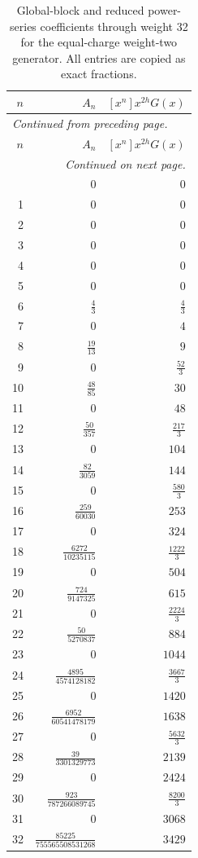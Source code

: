 \begingroup\small
\setlength{\tabcolsep}{5pt}
\begin{longtable}{rrr}
\caption{Global-block and reduced power-series coefficients through weight 32 for the equal-charge weight-two generator. All entries are copied as exact fractions.}\label{expphysics:blocks-u_equal_charge}\\
\toprule
$n$ & $A_n$ & $[x^n]x^{2h}G(x)$\\
\midrule
\endfirsthead
\multicolumn{3}{l}{\small\itshape Continued from preceding page.}\\
\toprule
$n$ & $A_n$ & $[x^n]x^{2h}G(x)$\\
\midrule
\endhead
\midrule
\multicolumn{3}{r}{\small\itshape Continued on next page.}\\
\endfoot
\bottomrule
\endlastfoot
0 & $0$ & $0$\\
1 & $0$ & $0$\\
2 & $0$ & $0$\\
3 & $0$ & $0$\\
4 & $0$ & $0$\\
5 & $0$ & $0$\\
6 & $\frac{4}{3}$ & $\frac{4}{3}$\\
7 & $0$ & $4$\\
8 & $\frac{19}{13}$ & $9$\\
9 & $0$ & $\frac{52}{3}$\\
10 & $\frac{48}{85}$ & $30$\\
11 & $0$ & $48$\\
12 & $\frac{50}{357}$ & $\frac{217}{3}$\\
13 & $0$ & $104$\\
14 & $\frac{82}{3059}$ & $144$\\
15 & $0$ & $\frac{580}{3}$\\
16 & $\frac{259}{60030}$ & $253$\\
17 & $0$ & $324$\\
18 & $\frac{6272}{10235115}$ & $\frac{1222}{3}$\\
19 & $0$ & $504$\\
20 & $\frac{724}{9147325}$ & $615$\\
21 & $0$ & $\frac{2224}{3}$\\
22 & $\frac{50}{5270837}$ & $884$\\
23 & $0$ & $1044$\\
24 & $\frac{4895}{4574128182}$ & $\frac{3667}{3}$\\
25 & $0$ & $1420$\\
26 & $\frac{6952}{60541478179}$ & $1638$\\
27 & $0$ & $\frac{5632}{3}$\\
28 & $\frac{39}{3301329773}$ & $2139$\\
29 & $0$ & $2424$\\
30 & $\frac{923}{787266089745}$ & $\frac{8200}{3}$\\
31 & $0$ & $3068$\\
32 & $\frac{85225}{755565508531268}$ & $3429$\\
\end{longtable}
\endgroup
